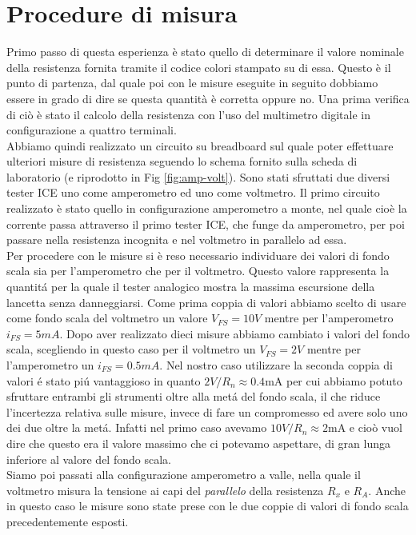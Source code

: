 \documentclass{article}
\begin{document}
\newpage

\section{Procedure di misura}
Primo passo di questa esperienza è stato quello di determinare il valore nominale della resistenza fornita tramite il codice colori stampato su di essa. Questo è il punto di partenza, dal quale poi con le misure eseguite in seguito dobbiamo essere in grado di dire se questa quantità è corretta oppure no. Una prima verifica di ciò è stato il calcolo della resistenza con l'uso del multimetro digitale in configurazione a quattro terminali. \\
Abbiamo quindi realizzato un circuito su breadboard sul quale poter effettuare ulteriori misure di resistenza seguendo lo schema fornito sulla scheda di laboratorio (e riprodotto in Fig \ref{fig:amp-volt}). Sono stati sfruttati due diversi tester ICE uno come amperometro ed uno come voltmetro. Il primo circuito realizzato è stato quello in configurazione amperometro a monte, nel quale cioè la corrente passa attraverso il primo tester ICE, che funge da amperometro, per poi passare nella resistenza incognita e nel voltmetro in parallelo ad essa.\\
Per procedere con le misure si è reso necessario individuare dei valori di fondo scala sia per l'amperometro che per il voltmetro. Questo valore rappresenta la quantit\'a per la quale il tester analogico mostra la massima escursione della lancetta senza danneggiarsi. Come prima coppia di valori abbiamo scelto di usare come fondo scala del voltmetro un valore \textit{$ V_{FS} = 10V$} mentre per l'amperometro \textit{$i_{FS} = 5mA$}. Dopo aver realizzato dieci misure abbiamo cambiato i valori del fondo scala, scegliendo in questo caso per il voltmetro un \textit{$ V_{FS} = 2V$} mentre per l'amperometro un \textit{$i_{FS} = 0.5mA$}. Nel nostro caso utilizzare la seconda coppia di valori \'e stato pi\'u vantaggioso in quanto $2V/R_n \approx 0.4 \si{\milli\ampere}$ per cui abbiamo potuto sfruttare entrambi gli strumenti oltre alla met\'a del fondo scala, il che riduce l'incertezza relativa sulle misure, invece di fare un compromesso ed avere solo uno dei due oltre la met\'a. Infatti nel primo caso avevamo $10V/R_n \approx 2 \si{\milli\ampere}$ e cioò vuol dire che questo era il valore massimo che ci potevamo aspettare, di gran lunga inferiore al valore del fondo scala.\\
Siamo poi passati alla configurazione amperometro a valle, nella quale il voltmetro misura la tensione ai capi del \textit{parallelo} della resistenza $R_x$ e $R_A$. Anche in questo caso le misure sono state prese con le due coppie di valori di fondo scala precedentemente esposti.\\ \\
\end{document}
